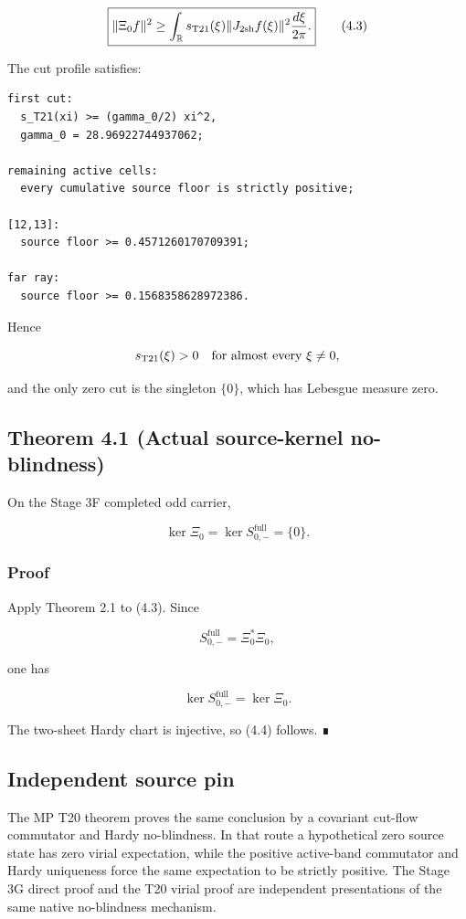 \[
\boxed{
\|\Xi_0f\|^2
\ge
\int_{\mathbb R}
 s_{\rm T21}(\xi)
 \|J_{\rm 2sh}f(\xi)\|^2
 \frac{d\xi}{2\pi}.
}
\tag{4.3}
\]

The cut profile satisfies:

\begin{verbatim}
first cut:
  s_T21(xi) >= (gamma_0/2) xi^2,
  gamma_0 = 28.96922744937062;

remaining active cells:
  every cumulative source floor is strictly positive;

[12,13]:
  source floor >= 0.4571260170709391;

far ray:
  source floor >= 0.1568358628972386.
\end{verbatim}

Hence

\[
s_{\rm T21}(\xi)>0
\quad\text{for almost every }\xi\ne0,
\]

and the only zero cut is the singleton \(\{0\}\), which has Lebesgue measure
zero.

\hypertarget{theorem-4.1-actual-source-kernel-no-blindness}{%
\subsection{Theorem 4.1 (Actual source-kernel no-blindness)}\label{theorem-4.1-actual-source-kernel-no-blindness}}

On the Stage 3F completed odd carrier,

\[
\boxed{
\ker\Xi_0
=
\ker S_{0,-}^{\mathrm{full}}
=
\{0\}.
}
\tag{4.4}
\]

\hypertarget{proof-2}{%
\subsubsection{Proof}\label{proof-2}}

Apply Theorem 2.1 to (4.3). Since

\[
S_{0,-}^{\mathrm{full}}=\Xi_0^*\Xi_0,
\]

one has

\[
\ker S_{0,-}^{\mathrm{full}}=\ker\Xi_0.
\]

The two-sheet Hardy chart is injective, so (4.4) follows. ∎

\hypertarget{independent-source-pin}{%
\subsection{Independent source pin}\label{independent-source-pin}}

The MP T20 theorem proves the same conclusion by a covariant cut-flow
commutator and Hardy no-blindness. In that route a hypothetical zero source
state has zero virial expectation, while the positive active-band commutator
and Hardy uniqueness force the same expectation to be strictly positive. The
Stage 3G direct proof and the T20 virial proof are independent presentations of
the same native no-blindness mechanism.

